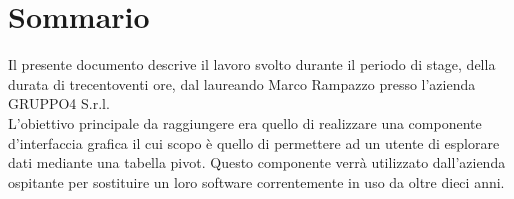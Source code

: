 
\cleardoublepage
{}
{}
\begingroup
\let\clearpage\relax
\let\cleardoublepage\relax
\let\cleardoublepage\relax

\chapter*{Sommario}

Il presente documento descrive il lavoro svolto durante il periodo di stage, della durata di trecentoventi ore, dal laureando Marco Rampazzo presso l'azienda GRUPPO4 S.r.l. \\
L'obiettivo principale da raggiungere era quello di realizzare una componente d'interfaccia grafica il cui scopo è quello di permettere ad un utente di esplorare dati mediante una tabella pivot. Questo componente verrà utilizzato dall'azienda ospitante per sostituire un loro software correntemente in uso da oltre dieci anni. 

%
%

\endgroup			

\vfill

